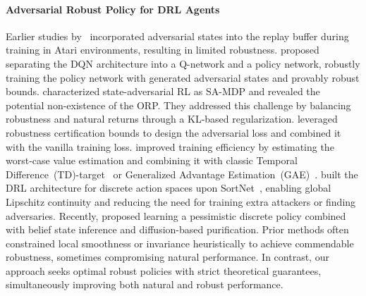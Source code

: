 \paragraph{Adversarial Robust Policy for DRL Agents}
Earlier studies by~\cite{kos2017delving, behzadan2017whatever} incorporated adversarial states into the replay buffer during training in Atari environments, resulting in limited robustness. 
\cite{fischer2019online} proposed separating the DQN architecture into a Q-network and a policy network, robustly training the policy network with generated adversarial states and provably robust bounds.
\cite{zhang2020robust} characterized state-adversarial RL as SA-MDP and revealed the potential non-existence of the ORP. They addressed this challenge by balancing robustness and natural returns through a KL-based regularization.
\cite{oikarinen2021robust} leveraged robustness certification bounds to design the adversarial loss and combined it with the vanilla training loss.
\cite{liang2022efficient} improved training efficiency by estimating the worst-case value estimation and combining it with classic Temporal Difference~(TD)-target~\citep{sutton1988learning} or Generalized Advantage Estimation~(GAE)~\citep{schulman2015high}.
\cite{nie2023improve} built the DRL architecture for discrete action spaces upon SortNet~\citep{zhang2022rethinking}, enabling global Lipschitz continuity and reducing the need for training extra attackers or finding adversaries. 
Recently, \cite{sun2024belief} proposed learning a pessimistic discrete policy combined with belief state inference and diffusion-based purification.
Prior methods often constrained local smoothness or invariance heuristically to achieve commendable robustness, sometimes compromising natural performance. In contrast, our approach seeks optimal robust policies with strict theoretical guarantees, simultaneously improving both natural and robust performance.

